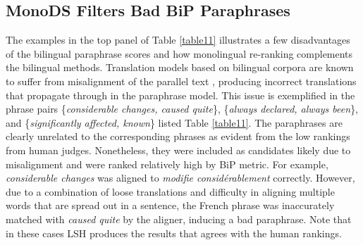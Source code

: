 \documentclass[11pt]{article}
\newcommand{\mnote}[1]{\marginpar{\raggedleft\footnotesize\itshape#1}}
\begin{document}
\subsection{MonoDS Filters Bad BiP Paraphrases}
The examples in the top panel of Table \ref{table11} illustrates a few disadvantages of the bilingual paraphrase scores and how monolingual re-ranking complements the bilingual methods. Translation models based on bilingual corpora are known to suffer from misalignment of the parallel text \cite{BannardCallisonBurch05}, producing incorrect translations that propagate through in the paraphrase model. This issue is exemplified in the phrase pairs \{\emph{considerable changes, caused quite}\}, \{\emph{always declared, always been}\}, and \{\emph{significantly affected, known}\} listed Table \ref{table11}. The paraphrases are clearly unrelated to the corresponding phrases as evident from the low rankings from human judges. Nonetheless, they were included as candidates likely due to misalignment and were ranked relatively high by BiP metric. For example, \emph{considerable changes} was aligned to \emph{modifie consid{\'e}rablement} correctly. However, due to a combination of loose translations and difficulty in aligning multiple words that are spread out in a sentence, the French phrase was inaccurately matched with \emph{caused quite} by the aligner, inducing a bad paraphrase. Note that in these cases LSH produces the results that agrees with the human rankings.


%
%
\end{document}
